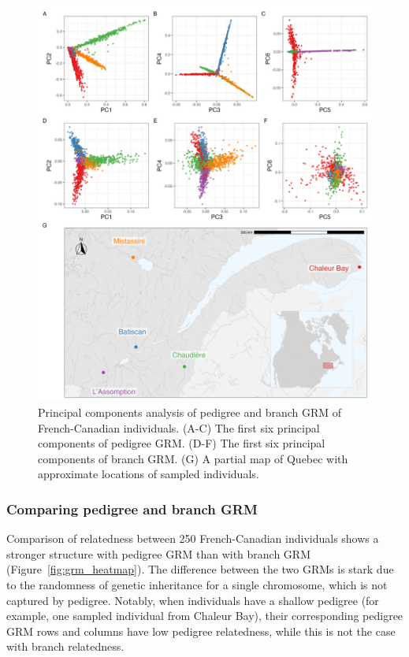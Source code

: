\begin{figure}
    \centering
    \includegraphics[width = \textwidth]{Figures/map_and_pca_grid4.jpg}
    \caption{Principal components analysis of pedigree and branch GRM of French-Canadian individuals.
    (A-C) The first six principal components of pedigree GRM.
    (D-F) The first six principal components of branch GRM.
    (G) A partial map of Quebec with approximate locations of sampled individuals. \label{fig:PCA_map}}
\end{figure}

\subsubsection{Comparing pedigree and branch GRM}

Comparison of relatedness between 250 French-Canadian individuals shows
a stronger structure with pedigree GRM than with branch GRM (Figure~\ref{fig:grm_heatmap}).
%
The difference between the two GRMs is stark
due to the randomness of genetic inheritance for a single chromosome,
which is not captured by pedigree.
%
%
Notably, when individuals have a shallow pedigree
(for example, one sampled individual from Chaleur Bay),
their corresponding pedigree GRM rows and columns have low pedigree relatedness,
while this is not the case with branch relatedness.

